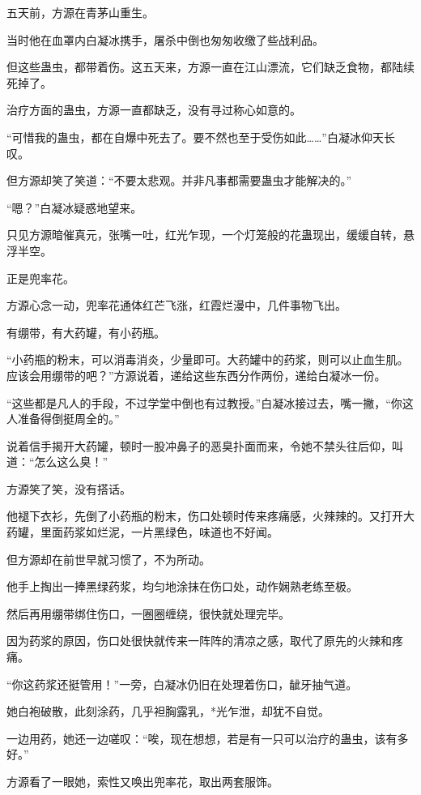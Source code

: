 
\begin{this_body}

五天前，方源在青茅山重生。

当时他在血罩内白凝冰携手，屠杀中倒也匆匆收缴了些战利品。

但这些蛊虫，都带着伤。这五天来，方源一直在江山漂流，它们缺乏食物，都陆续死掉了。

治疗方面的蛊虫，方源一直都缺乏，没有寻过称心如意的。

“可惜我的蛊虫，都在自爆中死去了。要不然也至于受伤如此……”白凝冰仰天长叹。

但方源却笑了笑道：“不要太悲观。并非凡事都需要蛊虫才能解决的。”

“嗯？”白凝冰疑惑地望来。

只见方源暗催真元，张嘴一吐，红光乍现，一个灯笼般的花蛊现出，缓缓自转，悬浮半空。

正是兜率花。

方源心念一动，兜率花通体红芒飞涨，红霞烂漫中，几件事物飞出。

有绷带，有大药罐，有小药瓶。

“小药瓶的粉末，可以消毒消炎，少量即可。大药罐中的药浆，则可以止血生肌。应该会用绷带的吧？”方源说着，递给这些东西分作两份，递给白凝冰一份。

“这些都是凡人的手段，不过学堂中倒也有过教授。”白凝冰接过去，嘴一撇，“你这人准备得倒挺周全的。”

说着信手揭开大药罐，顿时一股冲鼻子的恶臭扑面而来，令她不禁头往后仰，叫道：“怎么这么臭！”

方源笑了笑，没有搭话。

他褪下衣衫，先倒了小药瓶的粉末，伤口处顿时传来疼痛感，火辣辣的。又打开大药罐，里面药浆如烂泥，一片黑绿色，味道也不好闻。

但方源却在前世早就习惯了，不为所动。

他手上掏出一捧黑绿药浆，均匀地涂抹在伤口处，动作娴熟老练至极。

然后再用绷带绑住伤口，一圈圈缠绕，很快就处理完毕。

因为药浆的原因，伤口处很快就传来一阵阵的清凉之感，取代了原先的火辣和疼痛。

“你这药浆还挺管用！”一旁，白凝冰仍旧在处理着伤口，龇牙抽气道。

她白袍破散，此刻涂药，几乎袒胸露乳，*光乍泄，却犹不自觉。

一边用药，她还一边嗟叹：“唉，现在想想，若是有一只可以治疗的蛊虫，该有多好。”

方源看了一眼她，索性又唤出兜率花，取出两套服饰。


\end{this_body}
